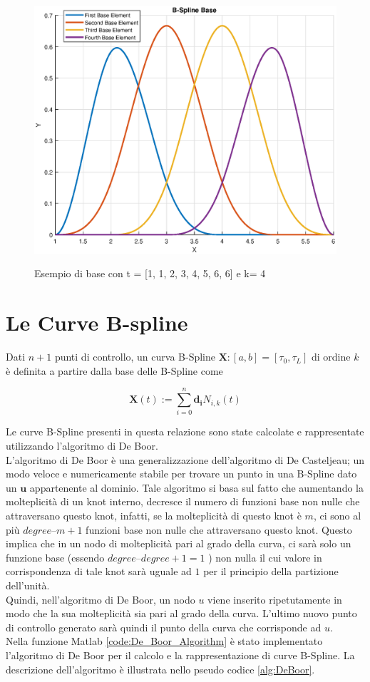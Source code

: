 \documentclass[a4paper, 12pt]{article}
\begin{document}
\begin{figure}[!]
	\centering
	\caption{Esempio di base con t = [1, 1, 2, 3, 4, 5, 6, 6] e k= 4}
	\includegraphics[scale=0.55]{plot_b-spline_base.eps}
	\label{fig:BSplineinBaseExample}
\end{figure}

\section{Le Curve B-spline}
Dati $n+1$ punti di controllo, un curva B-Spline $\mathbf{X} : [a,b] = [\tau_0, \tau_L]$ di ordine $k$ è definita a partire dalla base delle B-Spline come

$$\mathbf{X}(t) := \sum_{i=0}^{n} \mathbf{d_i} N_{i, k}(t)$$

Le curve B-Spline presenti in questa relazione sono state calcolate e rappresentate  utilizzando l'algoritmo di De Boor.\\ 
L'algoritmo di De Boor è una generalizzazione dell'algoritmo di De Casteljeau; un modo veloce e numericamente stabile per trovare un punto in una B-Spline dato un $\mathbf{u}$ appartenente al dominio. Tale algoritmo si basa sul fatto che aumentando la molteplicità di un knot interno, decresce il numero di funzioni base non nulle che attraversano questo knot, infatti, se la molteplicità di questo knot è $m$, ci sono al più $degree – m +1$ funzioni base non nulle che attraversano questo knot. Questo implica che in un nodo di molteplicità pari al grado della curva, ci sarà solo un funzione base (essendo $degree – degree + 1 = 1$ ) non nulla il cui valore in corrispondenza di tale knot sarà uguale ad $1$ per il principio della partizione dell'unità.\\
Quindi, nell'algoritmo di De Boor, un nodo $u$ viene inserito ripetutamente in modo che la sua molteplicità sia pari al grado della curva. L'ultimo nuovo punto di controllo generato sarà quindi il punto della curva che corrisponde ad $u$.\\
Nella funzione Matlab  \ref{code:De_Boor_Algorithm} è stato implementato l'algoritmo di De Boor per il calcolo e la rappresentazione di curve B-Spline. La descrizione dell'algoritmo è illustrata nello pseudo codice \ref{alg:DeBoor}.
\end{document}
